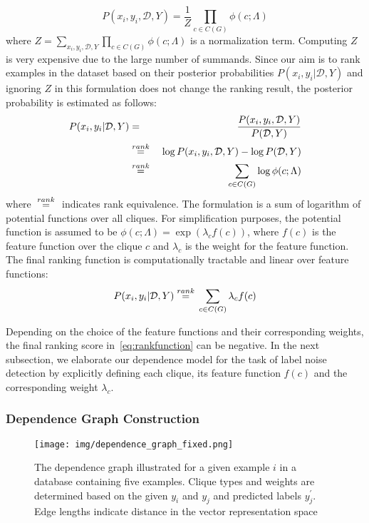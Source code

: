 \begin{equation} \label{eq:mrf}
P(x_{i},y_{i},\mathcal{D},Y) = \frac{1}{Z} \prod_{c\in C(G)} \phi(c;\Lambda)
\end{equation}
where $Z = \sum_{x_{i},y_{i},\mathcal{D}, Y}\prod_{c\in C(G)} \phi(c;\Lambda)$ is a normalization term.
Computing $Z$ is very expensive due to the large number of summands. Since our aim is to rank examples in the dataset based on their posterior probabilities $P(x_{i},y_{i}|\mathcal{D},Y)$ and ignoring $Z$ in this formulation does not change the ranking result, the posterior probability is estimated as follows:  
\begin{eqnarray}
P(x_{i},y_{i}|\mathcal{D},Y) &=& \frac{P(x_{i},y_{i},\mathcal{D},Y)}{P(\mathcal{D},Y)} \\ \nonumber
 & \; {\buildrel {rank} \over =}\; & \log P(x_{i},y_{i},\mathcal{D},Y) - \log P(\mathcal{D},Y) \\
 \nonumber
 & \; {\buildrel {rank} \over =}\;& \sum_{c\in C(G)} \log \phi(c;\Lambda)
\end{eqnarray}
where $\; {\buildrel {rank} \over =}\;$ indicates rank equivalence. The formulation is a sum of logarithm of potential functions over all cliques. For simplification purposes, the potential function is assumed to be $\phi(c;\Lambda) = \exp(\lambda_c f(c))$,
where $f(c)$ is the feature function over the clique $c$ and
$\lambda_c$ is the weight for the feature function.
The final ranking function is computationally tractable and linear over feature functions:
\begin{equation}
P(x_{i},y_{i}|\mathcal{D},Y) \; {\buildrel {rank} \over =}\; \sum_{c\in C(G)}
\lambda_c f(c) 
\label{eq:rankfunction}
\end{equation}

Depending on the choice of the feature functions and their corresponding weights, the final ranking score in~\ref{eq:rankfunction} can be negative. In the next subsection, we elaborate our dependence model for the task of label noise detection by explicitly defining each clique, its feature function $f(c)$ and the corresponding weight $\lambda_c$.







\subsubsection{Dependence Graph Construction}

\begin{figure}[t]
\centering
\texttt{[image: img/dependence\_graph\_fixed.png]}
\caption{The dependence graph illustrated for a given example $i$ in a database containing five examples. Clique types and weights are determined based on the given $y_i$ and $y_j$ and predicted labels $y_j^\prime$. Edge lengths indicate distance in the vector representation space}
\label{fig:dependence_graph}
\end{figure}








